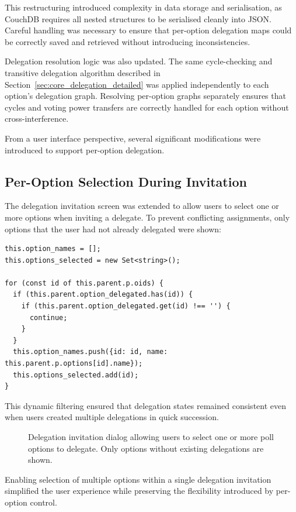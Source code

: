 This restructuring introduced complexity in data storage and serialisation, as CouchDB requires all nested structures to be serialised cleanly into JSON. Careful handling was necessary to ensure that per-option delegation maps could be correctly saved and retrieved without introducing inconsistencies.

Delegation resolution logic was also updated. The same cycle-checking and transitive delegation algorithm described in Section~\ref{sec:core_delegation_detailed} was applied independently to each option's delegation graph. Resolving per-option graphs separately ensures that cycles and voting power transfers are correctly handled for each option without cross-interference.

From a user interface perspective, several significant modifications were introduced to support per-option delegation.

\subsection{Per-Option Selection During Invitation}

The delegation invitation screen was extended to allow users to select one or more options when inviting a delegate. To prevent conflicting assignments, only options that the user had not already delegated were shown:

\begin{verbatim}
this.option_names = [];
this.options_selected = new Set<string>();

for (const id of this.parent.p.oids) {
  if (this.parent.option_delegated.has(id)) {
    if (this.parent.option_delegated.get(id) !== '') {
      continue;
    }
  }
  this.option_names.push({id: id, name: this.parent.p.options[id].name});
  this.options_selected.add(id);
}
\end{verbatim}

This dynamic filtering ensured that delegation states remained consistent even when users created multiple delegations in quick succession.

\begin{figure}[H]
  \centering
  \caption{Delegation invitation dialog allowing users to select one or more poll options to delegate. Only options without existing delegations are shown.}
  \label{fig:per-option-delegation-invite}
\end{figure}

Enabling selection of multiple options within a single delegation invitation simplified the user experience while preserving the flexibility introduced by per-option control.

